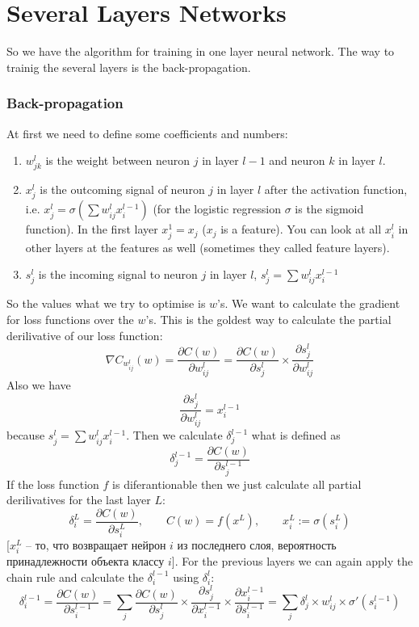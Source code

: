 \section{Several Layers Networks}

So we have the algorithm for training in one layer neural network. The way to trainig the several layers is the back-propagation. 

\subsubsection*{Back-propagation}

At first we need to define some coefficients and numbers:
\begin{enumerate}[label=$\bullet$]
  \item $w_{jk}^l$ is the weight between neuron $j$ in layer $l-1$ and neuron $k$ in layer $l$.
  \item $x_j^l$ is the outcoming signal of neuron $j$ in layer $l$ after the activation function, i.e. $x_j^l=\sigma\left(\sum w_{ij}^lx_i^{l-1}\right)$ (for the logistic regression $\sigma$ is the sigmoid function). In the first layer $x_j^1=x_j$ ($x_j$ is a feature). You can look at all $x_i^l$ in other layers at the features as well (sometimes they called feature layers).
  \item $s_j^l$ is the incoming signal to neuron $j$ in layer $l$, $s_j^l=\sum w_{ij}^lx_i^{l-1}$
\end{enumerate}
So the values what we try to optimise is $w$'s. We want to calculate the gradient for loss functions over the $w$'s. This is the goldest way to calculate the partial derilivative of our loss function:
$$\nabla C_{w_{ij}^l}(w)=\frac{\partial C(w)}{\partial w_{ij}^l}=\frac{\partial C(w)}{\partial s_j^l}\times\frac{\partial s_j^l}{\partial w_{ij}^l}$$
Also we have
$$\frac{\partial s_j^l}{\partial w_{ij}^l}=x_i^{l-1}$$
because $s_j^l=\sum w_{ij}^lx_i^{l-1}$. Then we calculate $\delta_j^{l-1}$ what is defined as
$$\delta_j^{l-1}=\frac{\partial C(w)}{\partial s_j^{l-1}}$$
If the loss function $f$ is diferantionable then we just calculate all partial derilivatives for the last layer $L$:
$$\delta_i^L=\frac{\partial C(w)}{\partial s_i^L},\qquad C(w)=f(x^L),\qquad x_i^L:=\sigma(s_i^L)$$
[$x_i^L$ -- то, что возвращает нейрон $i$ из последнего слоя, вероятность принадлежности объекта классу $i$]. For the previous layers we can again apply the chain rule and calculate the $\delta_i^{l-1}$ using $\delta_i^l$:
$$\delta_i^{l-1}=\frac{\partial C(w)}{\partial s_i^{l-1}}=\sum\limits_{j}\frac{\partial C(w)}{\partial s_j^l}\times\frac{\partial s_j^l}{\partial x_i^{l-1}}\times\frac{\partial x_i^{l-1}}{\partial s_i^{l-1}}=\sum\limits_{j}\delta_j^l\times w_{ij}^l\times\sigma'(s_i^{l-1})$$
